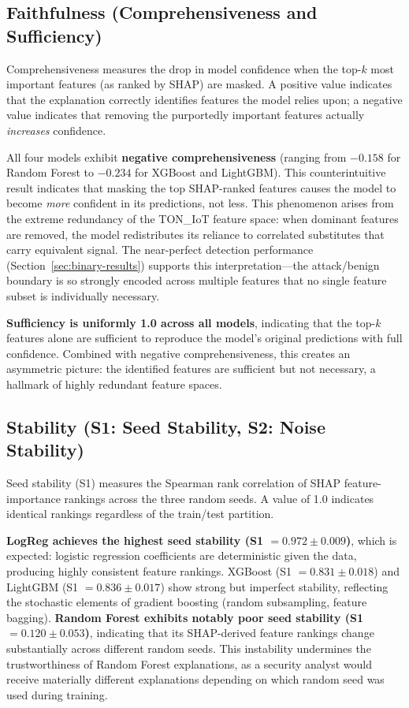\documentclass[12pt,a4paper]{report}
\begin{document}
\subsection{Faithfulness (Comprehensiveness and Sufficiency)}
\label{sec:faith-results}

Comprehensiveness measures the drop in model confidence when the top-$k$ most important features (as ranked by SHAP) are masked. A positive value indicates that the explanation correctly identifies features the model relies upon; a negative value indicates that removing the purportedly important features actually \emph{increases} confidence.

All four models exhibit \textbf{negative comprehensiveness} (ranging from $-0.158$ for Random Forest to $-0.234$ for XGBoost and LightGBM). This counterintuitive result indicates that masking the top SHAP-ranked features causes the model to become \emph{more} confident in its predictions, not less. This phenomenon arises from the extreme redundancy of the TON\_IoT feature space: when dominant features are removed, the model redistributes its reliance to correlated substitutes that carry equivalent signal. The near-perfect detection performance (Section~\ref{sec:binary-results}) supports this interpretation---the attack/benign boundary is so strongly encoded across multiple features that no single feature subset is individually necessary.

\textbf{Sufficiency is uniformly 1.0 across all models}, indicating that the top-$k$ features alone are sufficient to reproduce the model's original predictions with full confidence. Combined with negative comprehensiveness, this creates an asymmetric picture: the identified features are sufficient but not necessary, a hallmark of highly redundant feature spaces.

\subsection{Stability (S1: Seed Stability, S2: Noise Stability)}
\label{sec:stab-results}

Seed stability (S1) measures the Spearman rank correlation of SHAP feature-importance rankings across the three random seeds. A value of 1.0 indicates identical rankings regardless of the train/test partition.

\textbf{LogReg achieves the highest seed stability (S1 $= 0.972 \pm 0.009$)}, which is expected: logistic regression coefficients are deterministic given the data, producing highly consistent feature rankings. XGBoost (S1 $= 0.831 \pm 0.018$) and LightGBM (S1 $= 0.836 \pm 0.017$) show strong but imperfect stability, reflecting the stochastic elements of gradient boosting (random subsampling, feature bagging). \textbf{Random Forest exhibits notably poor seed stability (S1 $= 0.120 \pm 0.053$)}, indicating that its SHAP-derived feature rankings change substantially across different random seeds. This instability undermines the trustworthiness of Random Forest explanations, as a security analyst would receive materially different explanations depending on which random seed was used during training.
\end{document}
